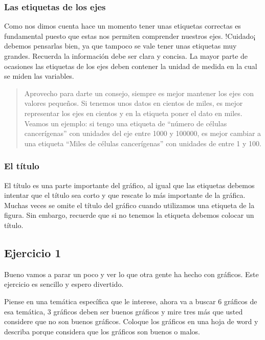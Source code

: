 \documentclass[]{article}
\begin{document}
\subsubsection{Las etiquetas de los
ejes}\label{las-etiquetas-de-los-ejes}

Como nos dimos cuenta hace un momento tener unas etiquetas correctas es
fundamental puesto que estas nos permiten comprender nuestros ejes.
!Cuidado¡ debemos pensarlas bien, ya que tampoco se vale tener unas
etiquetas muy grandes. Recuerda la información debe ser clara y concisa.
La mayor parte de ocasiones las etiquetas de los ejes deben contener la
unidad de medida en la cual se miden las variables.

\begin{quote}
Aprovecho para darte un consejo, siempre es mejor mantener los ejes con
valores pequeños. Si tenemos unos datos en cientos de miles, es mejor
representar los ejes en cientos y en la etiqueta poner el dato en miles.
Veamos un ejemplo: si tengo una etiqueta de ``número de células
cancerígenas'' con unidades del eje entre 1000 y 100000, es mejor
cambiar a una etiqueta ``Miles de células cancerígenas'' con unidades de
entre 1 y 100.
\end{quote}

\subsubsection{El título}\label{el-titulo}

El título es una parte importante del gráfico, al igual que las
etiquetas debemos intentar que el título sea corto y que rescate lo más
importante de la gráfica. Muchas veces se omite el título del gráfico
cuando utilizamos una etiqueta de la figura. Sin embargo, recuerde que
si no tenemos la etiqueta debemos colocar un título.

\subsection{Ejercicio 1}\label{ejercicio-1}

Bueno vamos a parar un poco y ver lo que otra gente ha hecho con
gráficos. Este ejercicio es sencillo y espero divertido.

Piense en una temática específica que le interese, ahora va a buscar 6
gráficos de esa temática, 3 gráficos deben ser buenos gráficos y mire
tres más que usted considere que no son buenos gráficos. Coloque los
gráficos en una hoja de word y describa porque considera que los
gráficos son buenos o malos.
\end{document}
